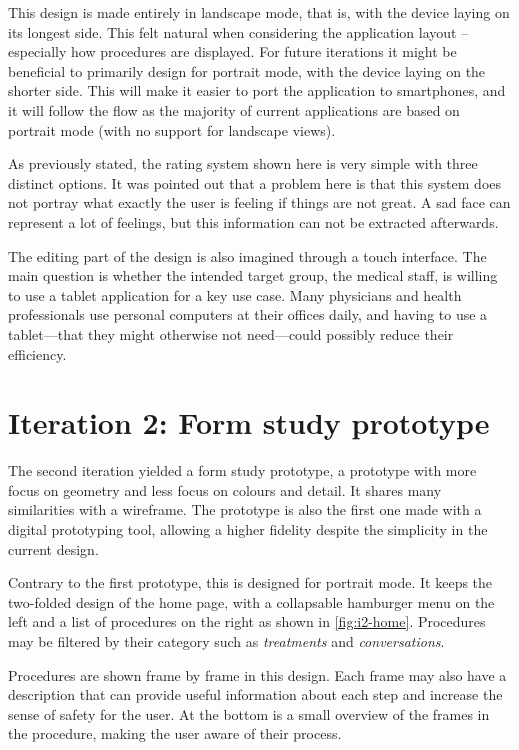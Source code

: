This design is made entirely in landscape mode, that is, with the device laying on its longest side. This felt natural when considering the application layout -- especially how procedures are displayed. For future iterations it might be beneficial to primarily design for portrait mode, with the device laying on the shorter side. This will make it easier to port the application to smartphones, and it will follow the flow as the majority of current applications are based on portrait mode (with no support for landscape views).

As previously stated, the rating system shown here is very simple with three distinct options. It was pointed out that a problem here is that this system does not portray what exactly the user is feeling if things are not great. A sad face can represent a lot of feelings, but this information can not be extracted afterwards.

The editing part of the design is also imagined through a touch interface. The main question is whether the intended target group, the medical staff, is willing to use a tablet application for a key use case. Many physicians and health professionals use personal computers at their offices daily, and having to use a tablet---that they might otherwise not need---could possibly reduce their efficiency.

\section{Iteration 2: Form study prototype}
\label{sec:iteration2}

The second iteration yielded a form study prototype, a prototype with more focus on geometry and less focus on colours and detail. It shares many similarities with a wireframe. The prototype is also the first one made with a digital prototyping tool, allowing a higher fidelity despite the simplicity in the current design.

Contrary to the first prototype, this is designed for portrait mode. It keeps the two-folded design of the home page, with a collapsable hamburger menu on the left and a list of procedures on the right as shown in \autoref{fig:i2-home}. Procedures may be filtered by their category such as \emph{treatments} and \emph{conversations}.

Procedures are shown frame by frame in this design. Each frame may also have a description that can provide useful information about each step and increase the sense of safety for the user. At the bottom is a small overview of the frames in the procedure, making the user aware of their process.

